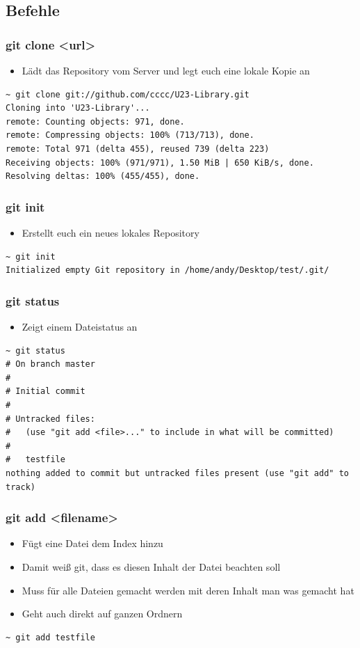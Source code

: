 \documentclass[ngerman,compress]{beamer}
\begin{document}
\subsection{Befehle}

\begin{frame} [fragile]
	\frametitle{git clone <url>}
	\begin{itemize}
		\item Lädt das Repository vom Server und legt euch eine lokale Kopie an
	\end{itemize}

	\begin{lstlisting}
~ git clone git://github.com/cccc/U23-Library.git
Cloning into 'U23-Library'...
remote: Counting objects: 971, done.
remote: Compressing objects: 100% (713/713), done.
remote: Total 971 (delta 455), reused 739 (delta 223)
Receiving objects: 100% (971/971), 1.50 MiB | 650 KiB/s, done.
Resolving deltas: 100% (455/455), done.
	\end{lstlisting}
\end{frame}

\begin{frame} [fragile]
	\frametitle{git init}
	\begin{itemize}
		\item Erstellt euch ein neues lokales Repository
	\end{itemize}
	\begin{lstlisting}
~ git init
Initialized empty Git repository in /home/andy/Desktop/test/.git/
	\end{lstlisting}
\end{frame}

\begin{frame} [fragile]
	\frametitle{git status}
	\begin{itemize}
		\item Zeigt einem Dateistatus an
	\end{itemize}
	\begin{lstlisting}
~ git status
# On branch master
#
# Initial commit
#
# Untracked files:
#   (use "git add <file>..." to include in what will be committed)
#
#	testfile
nothing added to commit but untracked files present (use "git add" to track)
	\end{lstlisting}

\end{frame}

\begin{frame} [fragile]
	\frametitle{git add <filename>}
	\begin{itemize}
		\item Fügt eine Datei dem Index hinzu
		\item Damit weiß git, dass es diesen Inhalt der Datei beachten soll
		\item Muss für alle Dateien gemacht werden mit deren Inhalt man was gemacht hat
		\item Geht auch direkt auf ganzen Ordnern
	\end{itemize}
	\begin{lstlisting}
~ git add testfile
	\end{lstlisting}
\end{frame}
\end{document}
